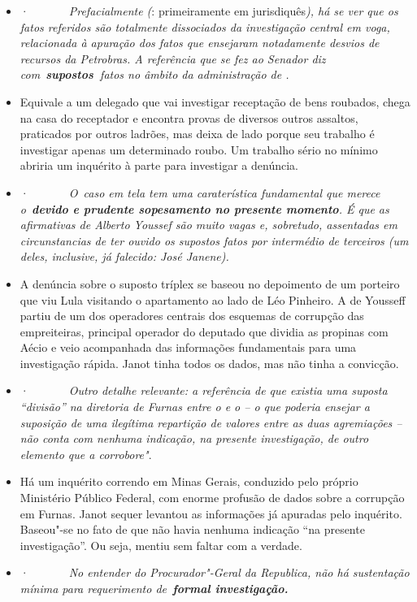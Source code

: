 \begin{itemize}
\itemsep1pt\parskip0pt
\item
  ·~~~~~~~\emph{Prefacialmente (}: primeiramente em
  jurisdiquês\emph{), há se ver que os fatos referidos são totalmente
  dissociados da investigação central em voga, relacionada à apuração
  dos fatos que ensejaram notadamente desvios de recursos da Petrobras.
  A referência que se fez ao Senador   diz
  com~\textbf{supostos~}fatos no âmbito da administração de .}
\item
  Equivale a um delegado que vai investigar receptação de bens roubados,
  chega na casa do receptador e encontra provas de diversos outros
  assaltos, praticados por outros ladrões, mas deixa de lado porque seu
  trabalho é investigar apenas um determinado roubo. Um trabalho sério
  no mínimo abriria um inquérito à parte para investigar a denúncia.
\item
  ·~~~~~~~\emph{O~caso em tela tem uma caraterística fundamental que
  merece o~\textbf{devido e prudente sopesamento no presente momento}. É
  que as afirmativas de Alberto Youssef são muito vagas e, sobretudo,
  assentadas em circunstancias de ter ouvido os supostos fatos por
  intermédio de terceiros (um deles, inclusive, já falecido: José
  Janene).}
\item
  A denúncia sobre o suposto tríplex se baseou no depoimento de um
  porteiro que viu Lula visitando o apartamento ao lado de Léo Pinheiro.
  A de Yousseff partiu de um dos operadores centrais dos esquemas de
  corrupção das empreiteiras, principal operador do deputado que dividia
  as propinas com Aécio e veio acompanhada das informações fundamentais
  para uma investigação rápida. Janot tinha todos os dados, mas não
  tinha a convicção.
\item
  ·~~~~~~~\emph{Outro detalhe relevante: a referência de que existia uma
  suposta ``divisão'' na diretoria de Furnas entre o  e o  -- o
  que poderia ensejar a suposição de uma ilegítima repartição de valores
  entre as duas agremiações -- não conta com nenhuma indicação, na
  presente investigação, de outro elemento que a corrobore"}.
\item
  Há um inquérito correndo em Minas Gerais, conduzido pelo próprio
  Ministério Público Federal, com enorme profusão de dados sobre a
  corrupção em Furnas. Janot sequer levantou as informações já apuradas
  pelo inquérito. Baseou"-se no fato de que não havia nenhuma indicação
  ``na presente investigação''. Ou seja, mentiu sem faltar com a
  verdade.
\item
  ·~~~~~~~\emph{No entender do Procurador"-Geral da Republica,
  \redondo{[…]} não há sustentação mínima para requerimento
  de~\textbf{formal investigação.}}
\end{itemize}

